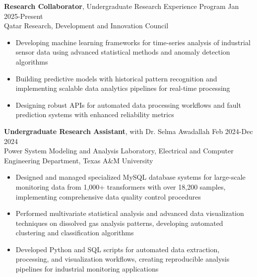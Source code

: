 \documentclass[resmargin, 10pt]{res} %
\begin{document}
\begin{resume}
\vspace{-3pt}
{\bf Research Collaborator}, Undergraduate Research Experience Program \hfill Jan 2025-Present \\
Qatar Research, Development and Innovation Council 
\begin{itemize}[itemsep=0em]
\item Developing machine learning frameworks for time-series analysis of industrial sensor data using advanced statistical methods and anomaly detection algorithms
\item Building predictive models with historical pattern recognition and implementing scalable data analytics pipelines for real-time processing
\item Designing robust APIs for automated data processing workflows and fault prediction systems with enhanced reliability metrics
\end{itemize} 

\vspace{-3pt}
{\bf Undergraduate Research Assistant}, with Dr. Selma Awadallah \hfill Feb 2024-Dec 2024 \\
Power System Modeling and Analysis Laboratory, Electrical and Computer Engineering Department, Texas A\&M University 

\begin{itemize}[itemsep=0em]
\item Designed and managed specialized MySQL database systems for large-scale monitoring data from 1,000+ transformers with over 18,200 samples, implementing comprehensive data quality control procedures
\item Performed multivariate statistical analysis and advanced data visualization techniques on dissolved gas analysis patterns, developing automated clustering and classification algorithms
\item Developed Python and SQL scripts for automated data extraction, processing, and visualization workflows, creating reproducible analysis pipelines for industrial monitoring applications
\end{itemize}

\vspace{-5pt}

\end{resume}
\end{document}
